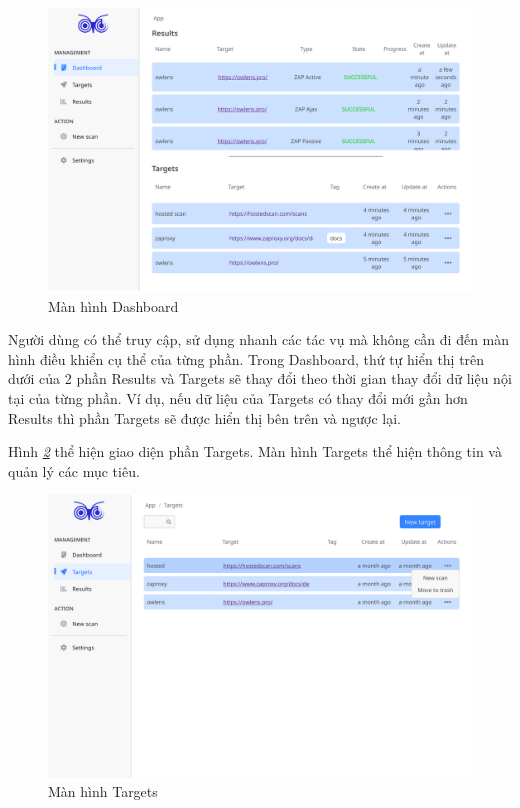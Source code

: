 \begin{figure}[H]
      \centering
      \includegraphics[width=\textwidth]{applied-thesis-chapters/chapter-6/Màn hình Dashboard.png}
      \caption{Màn hình Dashboard}
      \label{fig:ManHinhDashboard}
\end{figure}

Người dùng có thể truy cập, sử dụng nhanh các tác vụ mà không cần đi đến màn hình điều khiển cụ thể của từng phần.
Trong Dashboard, thứ tự hiển thị trên dưới của 2 phần Results và Targets sẽ thay đổi theo thời gian thay đổi dữ liệu nội tại của từng phần.
Ví dụ, nếu dữ liệu của Targets có thay đổi mới gần hơn Results thì phần Targets sẽ được hiển thị bên trên và ngược lại.

\tab \tab Hình \textit{\ref{fig:ManHinhTargets} } thể hiện giao diện phần Targets.
Màn hình Targets thể hiện thông tin và quản lý các mục tiêu.

\begin{figure}[H]
      \centering
      \includegraphics[width=\textwidth]{applied-thesis-chapters/chapter-6/Màn hình Targets.png}
      \caption{Màn hình Targets}
      \label{fig:ManHinhTargets}
\end{figure}

